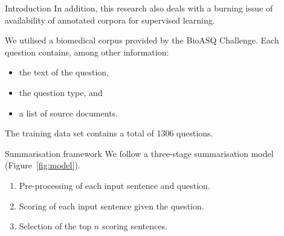 \documentclass[final]{beamer}
\newlength{\onecolwid}
\begin{document}
\begin{frame}[t]
\begin{columns}[t]
\begin{column}{\onecolwid}
\begin{block}{Introduction}
In addition, this research also deals with a burning issue of availability of annotated corpora for supervised learning. 

We utilised a biomedical corpus provided by the BioASQ Challenge. Each question contains, among other information:
\begin{itemize}
\item the text of the question, 
\item the question type, and 
\item a list of source documents.
\end{itemize}
The training data set contains a total of 1306 questions.
\end{block}


\begin{block}{Summarisation framework}
We follow a three-stage summarisation model (Figure~\ref{fig:model}).

\begin{enumerate}
\item Pre-processing of each input sentence and question.
\item Scoring of each input sentence given the question.
\item Selection of the top $n$ scoring sentences.
\end{enumerate}
\end{block}


\end{column}
\end{columns}
\end{frame}
\end{document}
